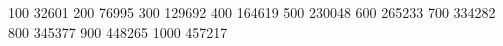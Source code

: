  100 32601
 200 76995
 300 129692
 400 164619
 500 230048
 600 265233
 700 334282
 800 345377
 900 448265
 1000 457217
